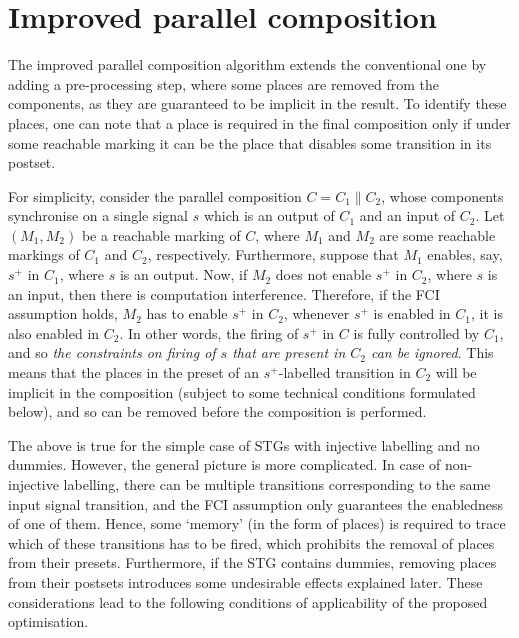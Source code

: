 \section{Improved parallel composition}\label{se-main}

The improved parallel composition algorithm extends the
conventional one by adding a pre-processing step, where some
places are removed from the components, as they are guaranteed
to be implicit in the result. To identify these places, one can
note that a place is required in the final composition only if
under some reachable marking it can be the place that
disables some transition in its postset.

For simplicity, consider the parallel composition
$C=C_1\parallel C_2$, whose components synchronise on a single
signal $s$ which is an output of $C_1$ and an input of $C_2$.
Let $(M_1,M_2)$ be a reachable marking of $C$, where $M_1$ and
$M_2$ are some reachable markings of $C_1$ and $C_2$,
respectively. Furthermore, suppose that $M_1$ enables, say,
$s^+$ in $C_1$, where $s$ is an output. Now, if $M_2$ does not
enable $s^+$ in $C_2$, where $s$ is an input, then there is
computation interference. Therefore, if the FCI assumption
holds, $M_2$ has to enable $s^+$ in $C_2$, \ie whenever $s^+$
is enabled in $C_1$, it is also enabled in $C_2$. In other
words, the firing of $s^+$ in $C$ is fully controlled by $C_1$,
and so \emph{the constraints on firing of $s$ that are present
in $C_2$ can be ignored}. This means that the places in the
preset of an $s^+$-labelled transition in $C_2$ will be
implicit in the composition (subject to some technical
conditions formulated below), and so can be removed before the
composition is performed.

The above is true for the simple case of STGs with injective
labelling and no dummies. However, the general picture is more
complicated. In case of non-injective labelling, there can be
multiple transitions corresponding to the same input signal
transition, and the FCI assumption only guarantees the
enabledness of one of them. Hence, some `memory' (in the form
of places) is required to trace which of these transitions has
to be fired, which prohibits the removal of places from their
presets. Furthermore, if the STG contains dummies, removing
places from their postsets introduces some undesirable effects
explained later. These considerations lead to the following
conditions of applicability of the proposed optimisation.


